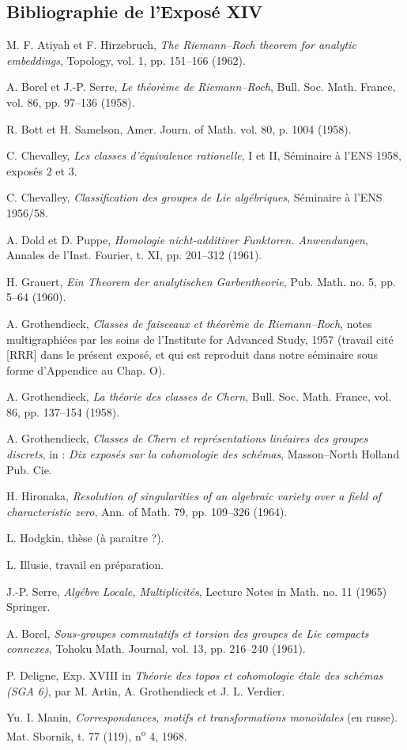 \subsection*{Bibliographie de l'Exposé XIV}
\begin{enumerate}[label={[\arabic*]}]
\item M. F. Atiyah et F. Hirzebruch, \emph{The Riemann--Roch theorem for analytic embeddings}, Topology, vol. 1, pp. 151--166 (1962).
\item A. Borel et J.-P. Serre, \emph{Le théorème de Riemann--Roch}, Bull. Soc. Math. France, vol. 86, pp. 97--136 (1958).
\item R. Bott et H. Samelson, Amer. Journ. of Math. vol. 80, p. 1004 (1958).
\item C. Chevalley, \emph{Les classes d'équivalence rationelle}, I et II, Séminaire à l'ENS 1958, exposés 2 et 3.
\item C. Chevalley, \emph{Classification des groupes de Lie algébriques}, Séminaire à l'ENS 1956/58.
\item A. Dold et D. Puppe, \emph{Homologie nicht-additiver Funktoren. Anwendungen}, Annales de l'Inst. Fourier, t. XI, pp. 201--312 (1961).
\item H. Grauert, \emph{Ein Theorem der analytischen Garbentheorie}, Pub. Math. no. 5, pp. 5--64 (1960).
\item A. Grothendieck, \emph{Classes de faisceaux et théorème de Riemann--Roch}, notes multigraphiées par les soins de l'Institute for Advanced Study, 1957 (travail cité [RRR] dans le présent exposé, et qui est reproduit dans notre séminaire sous forme d'Appendice au Chap. O).
\item A. Grothendieck, \emph{La théorie des classes de Chern}, Bull. Soc. Math. France, vol. 86, pp. 137--154 (1958).
\item A.
Grothendieck, \emph{Classes de Chern et représentations linéaires des groupes discrets}, in : \emph{Dix exposés sur la cohomologie des schémas}, Masson--North Holland Pub. Cie.
\item H. Hironaka, \emph{Resolution of singularities of an algebraic variety over a field of characteristic zero}, Ann. of Math. 79, pp. 109--326 (1964).
\item L. Hodgkin, thèse (à paraitre ?).
\item L. Illusie, travail en préparation.
\item J.-P. Serre, \emph{Algébre Locale, Multiplicités}, Lecture Notes in Math. no. 11 (1965) Springer.
\item A. Borel, \emph{Sous-groupes commutatifs et torsion des groupes de Lie compacts connexes}, Tohoku Math. Journal, vol. 13, pp. 216--240 (1961).
\item[{[16]}(*)] P. Deligne, Exp. XVIII in \emph{Théorie des topos et cohomologie étale des schémas (SGA 6)}, par M. Artin, A. Grothendieck et J. L. Verdier.
\item[{[17]}(*)] Yu. I. Manin, \emph{Correspondances, motifs et transformations monoïdales} (en russe). Mat. Sbornik, t. 77 (119), n\textsuperscript{o} 4, 1968.
\end{enumerate}


